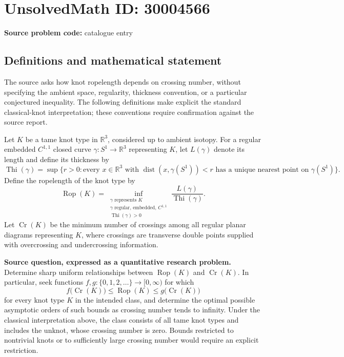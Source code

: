 \documentclass[11pt]{article}
\newcommand{\R}{\mathbb{R}}
\begin{document}
\section*{UnsolvedMath ID: 30004566}
\textbf{Source problem code:} catalogue entry
\subsection{Definitions and mathematical statement}
The source asks how knot ropelength depends on crossing number, without specifying the ambient space, regularity, thickness convention, or a particular conjectured inequality. The following definitions make explicit the standard classical-knot interpretation; these conventions require confirmation against the source report.

Let \(K\) be a tame knot type in \(\R^3\), considered up to ambient isotopy. For a regular embedded \(C^{1,1}\) closed curve \(\gamma:S^1\to\R^3\) representing \(K\), let \(L(\gamma)\) denote its length and define its thickness by
\[
\operatorname{Thi}(\gamma)=\sup\bigl\{r>0: \text{every }x\in\R^3\text{ with }\operatorname{dist}(x,\gamma(S^1))<r\text{ has a unique nearest point on }\gamma(S^1)\bigr\}.
\]
Define the ropelength of the knot type by
\[
\operatorname{Rop}(K)=\inf_{\substack{\gamma\text{ represents }K\\ \gamma\text{ regular, embedded, }C^{1,1}\\ \operatorname{Thi}(\gamma)>0}}
\frac{L(\gamma)}{\operatorname{Thi}(\gamma)}.
\]
Let \(\operatorname{Cr}(K)\) be the minimum number of crossings among all regular planar diagrams representing \(K\), where crossings are transverse double points supplied with overcrossing and undercrossing information.

\textbf{Source question, expressed as a quantitative research problem.} Determine sharp uniform relationships between \(\operatorname{Rop}(K)\) and \(\operatorname{Cr}(K)\). In particular, seek functions \(f,g:\{0,1,2,\ldots\}\to[0,\infty)\) for which
\[
 f\bigl(\operatorname{Cr}(K)\bigr)\leq \operatorname{Rop}(K)\leq g\bigl(\operatorname{Cr}(K)\bigr)
\]
for every knot type \(K\) in the intended class, and determine the optimal possible asymptotic orders of such bounds as crossing number tends to infinity. Under the classical interpretation above, the class consists of all tame knot types and includes the unknot, whose crossing number is zero. Bounds restricted to nontrivial knots or to sufficiently large crossing number would require an explicit restriction.
\end{document}
